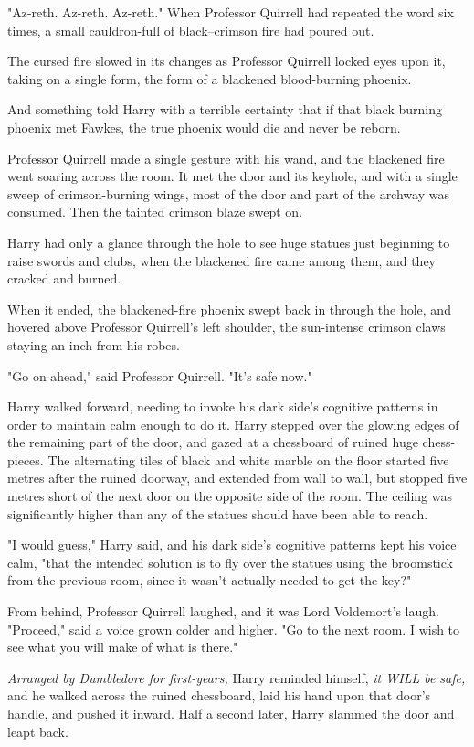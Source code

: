 "Az-reth. Az-reth. Az-reth." When Professor Quirrell had repeated the word six
times, a small cauldron-full of black--crimson fire had poured out.

The cursed fire slowed in its changes as Professor Quirrell locked eyes upon
it, taking on a single form, the form of a blackened blood-burning phoenix.

And something told Harry with a terrible certainty that if that black burning
phoenix met Fawkes, the true phoenix would die and never be reborn.

Professor Quirrell made a single gesture with his wand, and the blackened fire
went soaring across the room. It met the door and its keyhole, and with a
single sweep of crimson-burning wings, most of the door and part of the archway
was consumed. Then the tainted crimson blaze swept on.

Harry had only a glance through the hole to see huge statues just beginning to
raise swords and clubs, when the blackened fire came among them, and they
cracked and burned.

When it ended, the blackened-fire phoenix swept back in through the hole, and
hovered above Professor Quirrell's left shoulder, the sun-intense crimson claws
staying an inch from his robes.

"Go on ahead," said Professor Quirrell. "It's safe now."

Harry walked forward, needing to invoke his dark side's cognitive patterns in
order to maintain calm enough to do it. Harry stepped over the glowing edges of
the remaining part of the door, and gazed at a chessboard of ruined huge
chess-pieces. The alternating tiles of black and white marble on the floor
started five metres after the ruined doorway, and extended from wall to wall,
but stopped five metres short of the next door on the opposite side of the
room. The ceiling was significantly higher than any of the statues should have
been able to reach.

"I would guess," Harry said, and his dark side's cognitive patterns kept his
voice calm, "that the intended solution is to fly over the statues using the
broomstick from the previous room, since it wasn't actually needed to get the
key?"

From behind, Professor Quirrell laughed, and it was Lord Voldemort's laugh.
"Proceed," said a voice grown colder and higher. "Go to the next room. I wish
to see what you will make of what is there."

\emph{Arranged by Dumbledore for first-years,} Harry reminded himself, \emph{it
WILL be safe,} and he walked across the ruined chessboard, laid his hand upon
that door's handle, and pushed it inward.
\later
Half a second later, Harry slammed the door and leapt back.

